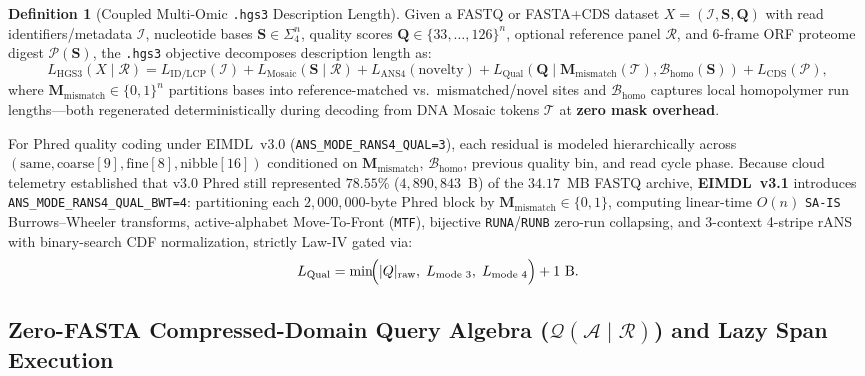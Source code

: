 \documentclass[10pt]{article}
\theoremstyle{definition}
\newtheorem{definition}{Definition}
\begin{document}
\begin{definition}[Coupled Multi-Omic \texttt{.hgs3} Description Length]
Given a FASTQ or FASTA+CDS dataset $X = (\mathcal{I}, \mathbf{S}, \mathbf{Q})$ with read identifiers/metadata $\mathcal{I}$, nucleotide bases $\mathbf{S} \in \Sigma_4^n$, quality scores $\mathbf{Q} \in \{33,\dots,126\}^n$, optional reference panel $\mathcal{R}$, and 6-frame ORF proteome digest $\mathcal{P}(\mathbf{S})$, the \texttt{.hgs3} objective decomposes description length as:
\begin{equation}
  L_{\text{HGS3}}(X \mid \mathcal{R}) = L_{\text{ID/LCP}}(\mathcal{I}) + L_{\text{Mosaic}}(\mathbf{S} \mid \mathcal{R}) + L_{\text{ANS4}}(\text{novelty}) + L_{\text{Qual}}(\mathbf{Q} \mid \mathbf{M}_{\text{mismatch}}(\mathcal{T}), \mathcal{B}_{\text{homo}}(\mathbf{S})) + L_{\text{CDS}}(\mathcal{P}),
\end{equation}
where $\mathbf{M}_{\text{mismatch}} \in \{0,1\}^n$ partitions bases into reference-matched vs.\ mismatched/novel sites and $\mathcal{B}_{\text{homo}}$ captures local homopolymer run lengths---both regenerated deterministically during decoding from DNA Mosaic tokens $\mathcal{T}$ at \textbf{zero mask overhead}.
\end{definition}

For Phred quality coding under EIMDL~v3.0 (\texttt{ANS\_MODE\_RANS4\_QUAL=3}), each residual is modeled hierarchically across $(\text{same}, \text{coarse}[9], \text{fine}[8], \text{nibble}[16])$ conditioned on $\mathbf{M}_{\text{mismatch}}$, $\mathcal{B}_{\text{homo}}$, previous quality bin, and read cycle phase. Because cloud telemetry established that v3.0 Phred still represented $78.55\%$ ($4,890,843$~B) of the $34.17$~MB FASTQ archive, \textbf{EIMDL~v3.1} introduces \texttt{ANS\_MODE\_RANS4\_QUAL\_BWT=4}: partitioning each $2{,}000{,}000$-byte Phred block by $\mathbf{M}_{\text{mismatch}} \in \{0,1\}$, computing linear-time $O(n)$ \texttt{SA-IS} Burrows--Wheeler transforms, active-alphabet Move-To-Front (\texttt{MTF}), bijective \texttt{RUNA}/\texttt{RUNB} zero-run collapsing, and 3-context 4-stripe rANS with binary-search CDF normalization, strictly Law-IV gated via:
\begin{equation}
  L_{\text{Qual}} = \min\!\Bigl(|Q|_{\text{raw}},\; L_{\text{mode 3}},\; L_{\text{mode 4}}\Bigr) + 1\text{~B}.
\end{equation}

\subsection{Zero-FASTA Compressed-Domain Query Algebra ($\mathcal{Q}(\mathcal{A} \mid \mathcal{R})$) and Lazy Span Execution}
\end{document}
